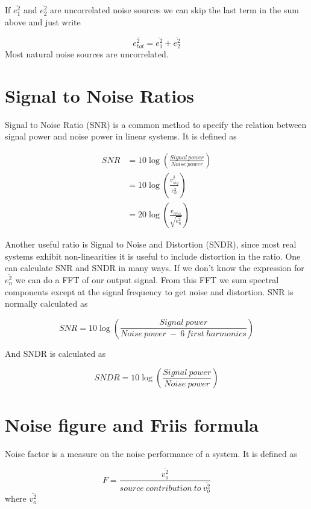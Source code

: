 If \(\overline{e_{1}^2}\) and \(\overline{e_{2}^2}\) are uncorrelated
noise sources we can skip the last term in the sum above and just write

\[\overline{e_{tot}^2} = \overline{e_{1}^2} + \overline{e_{2}^2}\] Most
natural noise sources are uncorrelated.

\section{Signal to Noise Ratios}\label{signal-to-noise-ratios}

Signal to Noise Ratio (SNR) is a common method to specify the relation
between signal power and noise power in linear systems. It is defined as

\[\begin{aligned}
  SNR &= 10 \log\left(\frac{Signal\:power}{Noise\:power}\right)\\
    &= 10 \log\left(\frac{\overline{v_{sig}^2}}{\overline{e_{n}^2}}\right)\\
  &=  20 \log\left(\frac{v_{rms}}{\sqrt{\overline{e_{n}^2}}}\right)
\end{aligned}\]

Another useful ratio is Signal to Noise and Distortion (SNDR), since
most real systems exhibit non-linearities it is useful to include
distortion in the ratio. One can calculate SNR and SNDR in many ways. If
we don't know the expression for \(\overline{e_{n}^2}\) we can do a FFT
of our output signal. From this FFT we sum spectral components except at
the signal frequency to get noise and distortion. SNR is normally
calculated as

\[SNR = 10
  \log\left(\frac{Signal\:power}{Noise\:power\:-\:6
\:first\:harmonics}\right)\]

And SNDR is calculated as

\[SNDR = 10\log\left(\frac{Signal\:power}{Noise\:  power}\right)\]

\section{Noise figure and Friis
formula}\label{noise-figure-and-friis-formula}

Noise factor is a measure on the noise performance of a system. It is
defined as

\[F =
  \frac{\overline{v_o^2}}{source\:contribution\:to\:\overline{v_o^2}}\]
where \(\overline{v_o^2}\)

